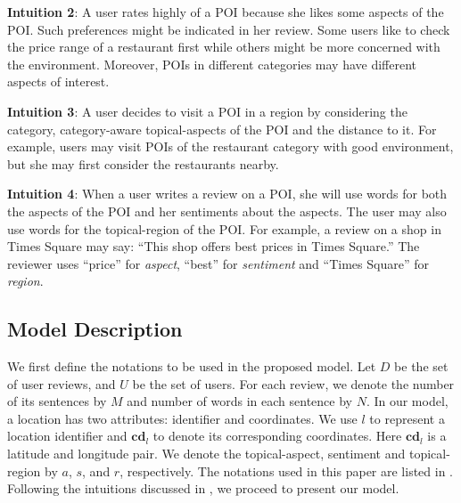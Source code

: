 \textbf{Intuition 2}: A user rates highly of a POI because
she likes some aspects of the POI. Such preferences might be
indicated in her review.
Some users like to check the price range of a restaurant first while
others might be more concerned with the environment. Moreover, POIs in different
categories may have different aspects of interest.

\textbf{Intuition 3}:
A user decides to visit a POI in a region
by considering the category, category-aware topical-aspects of the POI and
the distance to it. For example, users may visit POIs of the
restaurant category with good environment,
but she may first consider the restaurants nearby.

\textbf{Intuition 4}: When a user writes a review on a POI, she
will use words for both the aspects of the POI and
her sentiments about the aspects.
The user may also use words for the topical-region of the POI.
For example, a review on a shop in Times Square may say:
``This shop offers best prices in Times Square.'' The reviewer
uses ``price'' for {\em aspect}, ``best'' for {\em sentiment}
and ``Times Square'' for {\em region}. %

\subsection{Model Description}
We first define the notations
to be used in the proposed model. Let $D$ be the set of user reviews,
and $U$ be the set of users. For each review, we denote the
number of its sentences by $M$ and number of words in each
sentence by $N$. In our model, a location has two attributes:
identifier and coordinates. We use $l$ to represent a location identifier
and $\boldsymbol{cd}_l$ to denote its corresponding coordinates.
Here $\boldsymbol{cd}_l$ is a latitude and longitude pair. We denote
the topical-aspect, sentiment and topical-region by $a$, $s$,
and $r$, respectively. The notations
used in this paper are listed in .
Following the intuitions discussed in , we
proceed to present our model.

